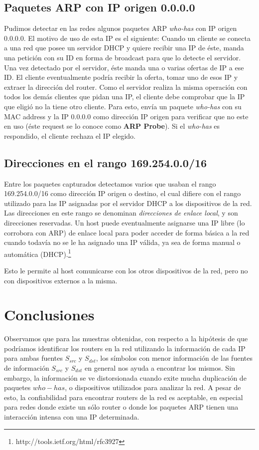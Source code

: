 \documentclass[10pt, a4paper]{article}
\begin{document}
\subsection{Paquetes ARP con IP origen 0.0.0.0}

Pudimos detectar en las redes algunos paquetes ARP \textit{who-has} con IP origen 0.0.0.0.
El motivo de uso de esta IP es el siguiente:
Cuando un cliente se conecta a una red que posee un servidor DHCP y quiere recibir una IP de éste, manda una petición con su ID en forma de broadcast para que lo detecte el servidor. Una vez detectado por el servidor, éste manda una o varias ofertas de IP a ese ID.
El cliente eventualmente podría recibir la oferta, tomar uno de esos IP y extraer la dirección del router.
Como el servidor realiza la misma operación con todos los demás clientes que pidan una IP, el cliente debe comprobar que la IP que eligió no la tiene otro cliente. Para esto, envía un paquete \textit{who-has} con su MAC address y la IP 0.0.0.0 como dirección IP origen para verificar que no este en uso (éste request se lo conoce como \textbf{ARP Probe}). Si el \textit{who-has} es respondido, el cliente rechaza el IP elegido.


\subsection{Direcciones en el rango 169.254.0.0/16}

Entre los paquetes capturados detectamos varios que usaban el rango 169.254.0.0/16 como dirección IP origen o destino, el cual difiere con el rango utilizado para las IP asignadas por el servidor DHCP a los dispositivos de la red. Las direcciones en este rango se denominan \textit{direcciones de enlace local}, y son direcciones reservadas. Un host puede eventualmente asignarse una IP libre (lo corrobora con ARP) de enlace local para poder acceder de forma básica a la red cuando todavía no se le ha asignado una IP válida, ya sea de forma manual o automática (DHCP).\footnote{http://tools.ietf.org/html/rfc3927}

Esto le permite al host comunicarse con los otros dispositivos de la red, pero no con dispositivos externos a la misma.

\section{Conclusiones}
Observamos que para las muestras obtenidas, con respecto a la hipótesis de que podríamos identificar los routers en la red utilizando la información de cada IP para ambas fuentes $S_{src}$ y $S_{dst}$,  los símbolos con menor información de las fuentes de información $S_{src}$ y $S_{dst}$  en general nos ayuda a encontrar los mismos. Sin embargo, la información se ve distorsionada cuando exite mucha duplicación de paquetes $who-has$, o dispositivos utilizados para analizar la red. A pesar de esto, la confiabilidad para encontrar routers de la red es aceptable, en especial para redes donde existe un sólo router o donde los paquetes ARP tienen una interacción intensa con una IP determinada.
\end{document}
